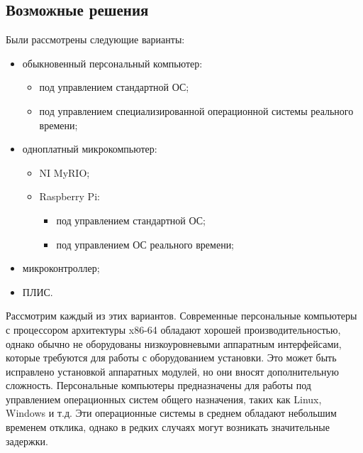 \documentclass[14pt,russian,a4paper]{extarticle}
\begin{document}
\subsection{Возможные решения}
Были рассмотрены следующие варианты:
\begin{itemize}
    \item обыкновенный персональный компьютер:
    \begin{itemize}
        \item под управлением стандартной ОС;
        \item под управлением специализированной операционной системы реального времени;
    \end{itemize}
    \item одноплатный микрокомпьютер:
    \begin{itemize}
        \item NI MyRIO\cite{myrio};
        \item Raspberry Pi\cite{raspberry_pi}:
        \begin{itemize}
            \item под управлением стандартной ОС;
            \item под управлением ОС реального времени;
        \end{itemize}
    \end{itemize}
    \item микроконтроллер;
    \item ПЛИС.
\end{itemize}
Рассмотрим каждый из этих вариантов.
\newline
Современные персональные компьютеры с процессором архитектуры x86-64 обладают хорошей производительностью, однако обычно не оборудованы низкоуровневыми аппаратным интерфейсами, которые требуются для работы с оборудованием установки. Это может быть исправлено установкой аппаратных модулей, но они вносят дополнительную сложность. Персональные компьютеры предназначены для работы под управлением операционных систем общего назначения, таких как Linux, Windows и т.д. Эти операционные системы в среднем обладают небольшим временем отклика, однако в редких случаях могут возникать значительные задержки.
\newline
\end{document}
